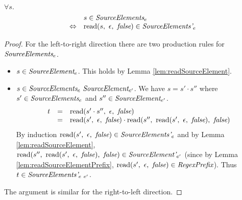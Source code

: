 \documentclass[preprint,10pt]{sigplanconf}
\begin{document}
\begin{lemma}\mbox{}

  \( \forall s. \) 
  \[
  \begin{array}{rl}
  &s \in \textit{SourceElements}_{e} 
  \\
  \Leftrightarrow&
  \textrm{read}(s,~\epsilon,~\textit{false}) \in \textit{SourceElements'}_{e} 
  \end{array}
  \]
\end{lemma}
\begin{proof}
  For the left-to-right direction there are two production rules for
  \( \textit{SourceElements}_{e} \).
  \begin{itemize}
  \item \( s \in \textit{SourceElement}_{e} \). This holds by Lemma
    \ref{lem:readSourceElement}.
    
  \item \( s \in \textit{SourceElements}_{e}~\textit{SourceElement}_{e'} \).
    We have
    \( s = s' \cdot s'' \) where \( s' \in \textit{SourceElements}_{e}
    \) and \( s'' \in \textit{SourceElement}_{e'} \).
    \[
    \begin{array}{rcl}
      t &=& \textrm{read}(s'\cdot s'',~\epsilon,~\textit{false})
      \\
      &=& \textrm{read}(s',~\epsilon,~\textit{false})\cdot  
      \textrm{read}(s'',~\textrm{read}(s',~\epsilon,~\textit{false}),~\textit{false})
    \end{array}
    \]
    By induction \( \textrm{read}(s',~\epsilon,~\textit{false}) \in
    \textit{SourceElements'}_{e} \) and by Lemma
    \ref{lem:readSourceElement}, \( \textrm{read}(s'',~
      \textrm{read}(s',~\epsilon,~\textit{false}),~\textit{false}) \in \textit{SourceElement'}_{e'} \) (since
    by Lemma \ref{lem:readSourceElementPrefix}, \( 
    \textrm{read}(s',~\epsilon,~\textit{false}) \in \textit{RegexPrefix} \)). Thus \( t \in
    \textit{SourceElements'}_{e~e'} \).
  \end{itemize}
  
  The argument is similar for the right-to-left direction.
\end{proof}
\end{document}
